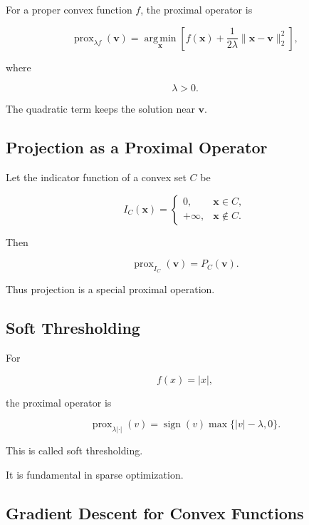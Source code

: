 For a proper convex function \(f\), the proximal operator is

\[
\boxed{
\operatorname{prox}_{\lambda f}(\mathbf{v})
=
\operatorname*{arg\,min}_{\mathbf{x}}
\left[
f(\mathbf{x})
+
\frac{1}{2\lambda}
\|
\mathbf{x}-\mathbf{v}
\|_2^2
\right],
}
\]

where

\[
\lambda>0.
\]

The quadratic term keeps the solution near \(\mathbf{v}\).

\subsection{Projection as a Proximal Operator}
\label{subsec:projection-proximal}

Let the indicator function of a convex set \(C\) be

\[
\boxed{
I_C(\mathbf{x})
=
\begin{cases}
0,
&
\mathbf{x}\in C,
\\
+\infty,
&
\mathbf{x}\notin C.
\end{cases}
}
\]

Then

\[
\boxed{
\operatorname{prox}_{I_C}(\mathbf{v})
=
P_C(\mathbf{v}).
}
\]

Thus projection is a special proximal operation.

\subsection{Soft Thresholding}
\label{subsec:soft-thresholding}

For

\[
f(x)=|x|,
\]

the proximal operator is

\[
\boxed{
\operatorname{prox}_{\lambda|\cdot|}(v)
=
\operatorname{sign}(v)
\max
\{
|v|-\lambda,
0
\}.
}
\]

This is called soft thresholding.

It is fundamental in sparse optimization.

\subsection{Gradient Descent for Convex Functions}
\label{subsec:gradient-descent-convex}


